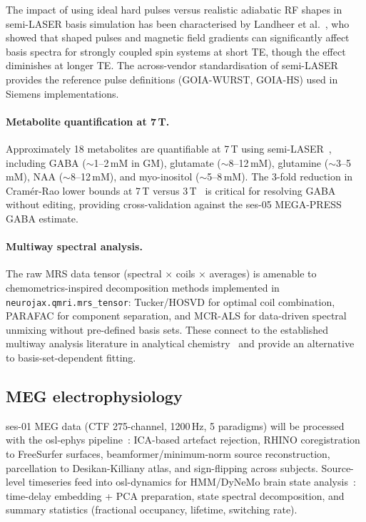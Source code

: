 \documentclass[11pt,a4paper]{article}\usepackage[]{graphicx}\usepackage[]{xcolor}
\begin{document}
The impact of using ideal hard pulses versus realistic adiabatic RF
shapes in semi-LASER basis simulation has been characterised by
Landheer et al.~\citep{Landheer2021slaser}, who showed that shaped
pulses and magnetic field gradients can significantly affect basis
spectra for strongly coupled spin systems at short TE, though the
effect diminishes at longer TE. The across-vendor standardisation of
semi-LASER~\citep{Oz2020slaser} provides the reference pulse
definitions (GOIA-WURST, GOIA-HS) used in Siemens implementations.

\paragraph{Metabolite quantification at 7\,T.}
Approximately 18 metabolites are quantifiable at 7\,T using
semi-LASER~\citep{Tkac2009sevenT}, including GABA ($\sim$1--2\,mM in
GM), glutamate ($\sim$8--12\,mM), glutamine ($\sim$3--5\,mM), NAA
($\sim$8--12\,mM), and myo-inositol ($\sim$5--8\,mM). The 3-fold
reduction in Cram\'{e}r-Rao lower bounds at 7\,T versus
3\,T~\citep{Mekle2009sevenT} is critical for resolving GABA without
editing, providing cross-validation against the ses-05 MEGA-PRESS
GABA estimate.

\paragraph{Multiway spectral analysis.}
The raw MRS data tensor (spectral $\times$ coils $\times$ averages)
is amenable to chemometrics-inspired decomposition methods
implemented in \texttt{neurojax.qmri.mrs\_tensor}: Tucker/HOSVD for
optimal coil combination, PARAFAC for component separation, and
MCR-ALS for data-driven spectral unmixing without pre-defined basis
sets. These connect to the established multiway analysis literature
in analytical chemistry~\citep{Bro1997parafac} and provide an
alternative to basis-set-dependent fitting.

\subsection{MEG electrophysiology}

ses-01 MEG data (CTF 275-channel, 1200\,Hz, 5 paradigms) will be
processed with the osl-ephys pipeline~\citep{vanEs2025oslephys}:
ICA-based artefact rejection, RHINO coregistration to FreeSurfer
surfaces, beamformer/minimum-norm source reconstruction, parcellation
to Desikan-Killiany atlas, and sign-flipping across subjects.
Source-level timeseries feed into osl-dynamics for HMM/DyNeMo brain
state analysis~\citep{Gohil2023dynemo}: time-delay embedding + PCA
preparation, state spectral decomposition, and summary statistics
(fractional occupancy, lifetime, switching rate).
\end{document}
